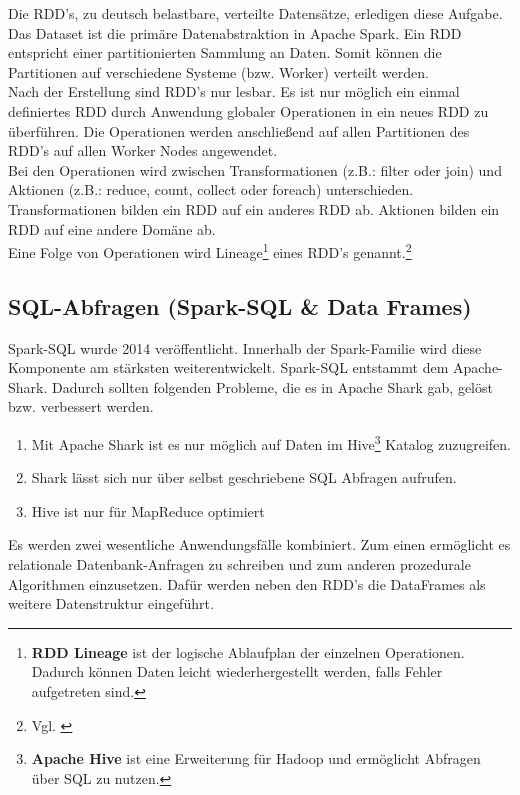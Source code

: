 \noindent
Die RDD's, zu deutsch belastbare, verteilte Datensätze, erledigen diese Aufgabe. Das Dataset ist die primäre Datenabstraktion in Apache Spark. 
Ein RDD entspricht einer partitionierten Sammlung an Daten. Somit können die Partitionen auf verschiedene Systeme (bzw. Worker) verteilt werden.  \\
Nach der Erstellung sind RDD's nur lesbar. Es ist nur möglich ein einmal definiertes RDD durch Anwendung globaler Operationen in ein neues RDD zu überführen. Die Operationen werden anschließend auf allen Partitionen des RDD's auf allen Worker Nodes angewendet. \\
\noindent
Bei den Operationen wird zwischen Transformationen (z.B.: filter oder join) und Aktionen (z.B.: reduce, count, collect oder foreach) unterschieden. Transformationen bilden ein RDD auf ein anderes RDD ab. Aktionen bilden ein RDD auf eine andere Domäne ab.\\ %
\noindent
Eine Folge von Operationen wird Lineage\footnote{\textbf{RDD Lineage} ist der logische Ablaufplan der einzelnen Operationen. Dadurch können Daten leicht wiederhergestellt werden, falls Fehler aufgetreten sind.} eines RDD's genannt.\footnote{Vgl. \cite{ZC+12}}



\newpage
\subsection{SQL-Abfragen (Spark-SQL \& Data Frames)}\label{sec_sparksql}

Spark-SQL wurde 2014 veröffentlicht. Innerhalb der Spark-Familie wird diese Komponente am stärksten weiterentwickelt. Spark-SQL entstammt dem Apache-Shark. Dadurch sollten folgenden Probleme, die es in Apache Shark gab, gelöst bzw. verbessert werden.
\begin{enumerate}
	\item Mit Apache Shark ist es nur möglich auf Daten im Hive\footnote{\textbf{Apache Hive} ist eine Erweiterung für Hadoop und ermöglicht Abfragen über SQL zu nutzen.} Katalog zuzugreifen. 
	\item Shark lässt sich nur über selbst geschriebene SQL Abfragen aufrufen. 
	\item Hive ist nur für MapReduce optimiert
\end{enumerate}

\noindent
Es werden zwei wesentliche Anwendungsfälle kombiniert. Zum einen ermöglicht es relationale Datenbank-Anfragen zu schreiben und zum anderen prozedurale Algorithmen einzusetzen. 
Dafür werden neben den RDD's die DataFrames als weitere Datenstruktur eingeführt.\\

